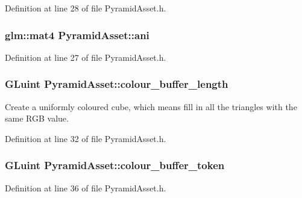 Definition at line 28 of file Pyramid\+Asset.\+h.

\hypertarget{class_pyramid_asset_aa261d31a01a327a581604d199c73de13}{}
\subsubsection[{ani}]{\setlength{\rightskip}{0pt plus 5cm}glm\+::mat4 Pyramid\+Asset\+::ani}\label{class_pyramid_asset_aa261d31a01a327a581604d199c73de13}


Definition at line 27 of file Pyramid\+Asset.\+h.

\hypertarget{class_pyramid_asset_addd87a747d7bd186bd1b3e3070185c69}{}
\subsubsection[{colour\+\_\+buffer\+\_\+length}]{\setlength{\rightskip}{0pt plus 5cm}G\+Luint Pyramid\+Asset\+::colour\+\_\+buffer\+\_\+length\hspace{0.3cm}{\ttfamily [private]}}\label{class_pyramid_asset_addd87a747d7bd186bd1b3e3070185c69}
Create a uniformly coloured cube, which means fill in all the triangles with the same R\+G\+B value. 

Definition at line 32 of file Pyramid\+Asset.\+h.

\hypertarget{class_pyramid_asset_a1c82b429f52d92feefacb5755017aec0}{}
\subsubsection[{colour\+\_\+buffer\+\_\+token}]{\setlength{\rightskip}{0pt plus 5cm}G\+Luint Pyramid\+Asset\+::colour\+\_\+buffer\+\_\+token\hspace{0.3cm}{\ttfamily [private]}}\label{class_pyramid_asset_a1c82b429f52d92feefacb5755017aec0}


Definition at line 36 of file Pyramid\+Asset.\+h.

\hypertarget{class_pyramid_asset_a5566105859271b493eab3b5f9c02f866}{}

